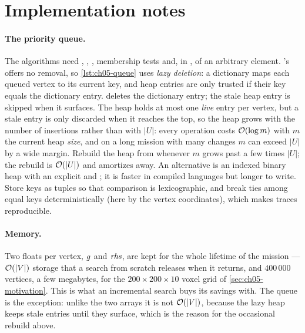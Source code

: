 \section{Implementation notes}
\label{sec:ch05-implementation}

\paragraph{The priority queue.}
The algorithms need \IncInsert, \IncPop, \IncTopKey, membership tests and, in
\DslUpdateVertex, \IncRemove of an arbitrary element. \python's  offers no
removal, so \cref{lst:ch05-queue} uses \emph{lazy deletion}: a dictionary maps each queued vertex to its current key, and heap entries
are only trusted if their key equals the dictionary entry. \IncRemove deletes the
dictionary entry; the stale heap entry is skipped when it surfaces. The heap holds at
most one \emph{live} entry per vertex, but a stale entry is only discarded when it
reaches the top, so the heap grows with the number of insertions rather than with $|U|$:
every operation costs $\mathcal{O}\!\left(\log m\right)$ with $m$ the current heap \emph{size}, and on a
long mission with many changes $m$ can exceed $|U|$ by a wide margin. Rebuild the heap
from  whenever $m$ grows past a few times $|U|$; the rebuild is
$\mathcal{O}\!\left(|U|\right)$ and amortizes away. An alternative is an
indexed binary heap with an explicit  and ; it is
faster in compiled languages but longer to write. Store keys as tuples so that
comparison is lexicographic, and break ties among equal keys deterministically (here by
the vertex coordinates), which makes traces reproducible.

\paragraph{Memory.}
Two floats per vertex, $g$ and $\mathit{rhs}$, are kept for the whole lifetime of the
mission --- $\mathcal{O}\!\left(|V|\right)$ storage that a search from scratch releases when it returns,
and $400\,000$ vertices, a few megabytes, for the $200\times200\times10$ voxel grid of
\cref{sec:ch05-motivation}. This is what an incremental search buys its savings with.
The queue is the exception: unlike the two arrays it is not $\mathcal{O}\!\left(|V|\right)$, because the
lazy heap keeps stale entries until they surface, which is the reason for the occasional
rebuild above.

